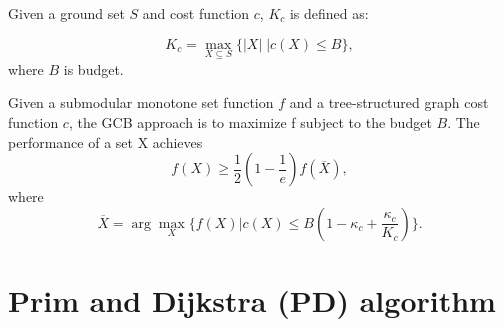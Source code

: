 \begin{definition}
Given a ground set $S$ and cost function $c$, $K_c$ is defined as:

\begin{equation}
K_c = \max_{X\subseteq S}\{|X|\; | c(X) \le B\},
\end{equation}
where $B$ is budget.
\label{def:K_c}
\end{definition}

%

\begin{theorem}
Given a submodular monotone set function $f$ and a tree-structured graph cost function $c$,
the GCB approach is to maximize f subject to the budget $B$.
The performance of a set X achieves
\begin{equation}
  f(X)\ge\frac{1}{2}(1-\frac{1}{e})f(\overline{X}),
\end{equation}
where
\begin{equation}
 \overline{X} = \arg\max _X\{
f(X) | c(X)\le B(1-\kappa_c + \frac{\kappa_c}{K_c})
\}.
\label{eq:OPT_lin}
\end{equation}

\label{thm:GCB_lin}
\end{theorem}

\section{Prim and Dijkstra (PD) algorithm}

